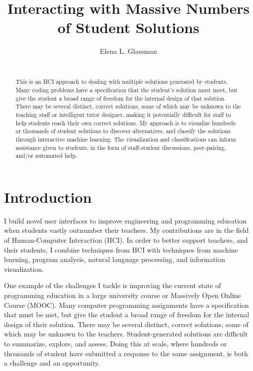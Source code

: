 \documentclass{sigchi}
\begin{document}
\title{Interacting with Massive Numbers of Student Solutions}

\author{
  \alignauthor Elena L. Glassman\\
    \\
}

\maketitle

\begin{abstract}
This is an HCI approach to dealing with multiple solutions generated by students. Many coding problems have a specification that the student's solution must meet, but give the student a broad range of freedom for the internal design of that solution. There may be several distinct, correct solutions, some of which may be unknown to the teaching staff or intelligent tutor designer, making it potentially difficult for staff to help students reach their own correct solutions. My approach is to visualize hundreds or thousands of student solutions to discover alternatives, and classify the solutions through interactive machine learning. The visualization and classifications can inform assistance given to students, in the form of staff-student discussions, peer-pairing, and/or automated help.
\end{abstract}



\section{Introduction}


I build novel user interfaces to improve engineering and programming education when students vastly outnumber their teachers. My contributions are in the field of Human-Computer Interaction (HCI). In order to better support teachers, and their students, I combine techniques from HCI with techniques from machine learning, program analysis, natural language processing, and information visualization.

One example of the challenges I tackle is improving the current state of programming education in a large university course or Massively Open Online Course (MOOC). Many computer programming assignments have a specification that must be met, but give the student a broad range of freedom for the internal design of their solution. There may be several distinct, correct solutions, some of which may be unknown to the teachers. Student-generated solutions are difficult to summarize, explore, and assess. Doing this at scale, where hundreds or thousands of student have submitted a response to the same assignment, is both a challenge and an opportunity. 
\end{document}

